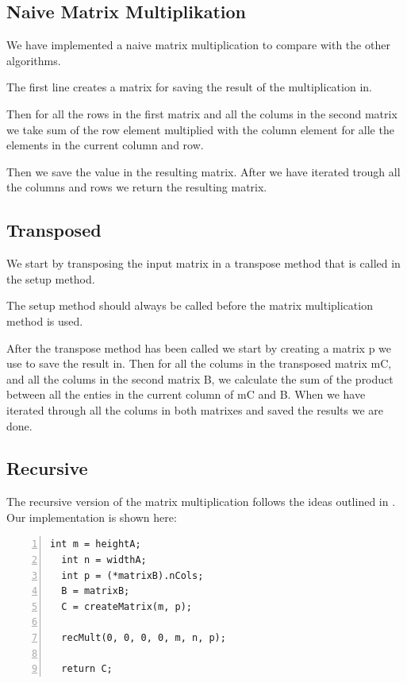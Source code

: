 \subsection{Naive Matrix Multiplikation}
We have implemented a naive matrix multiplication to compare with the other algorithms.

The first line creates a matrix for saving the result of the multiplication in.

Then for all the rows in the first matrix and all the colums in the second matrix we take sum of the row element multiplied with the column element for alle the elements in the current column and row.

Then we save the value in the resulting matrix.
After we have iterated trough all the columns and rows we return the resulting matrix.


\subsection{Transposed}

We start by transposing the input matrix in a transpose method that is called in the setup method.

The setup method should always be called before the matrix multiplication method is used.

After the transpose method has been called we start by creating a matrix p we use to save the result in.
Then for all the colums in the transposed matrix mC, and all the colums in the second matrix B, we calculate the sum of the product between all the enties in the current column of mC and B.
When we have iterated through all the colums in both matrixes and saved the results we are done.



\subsection{Recursive}
The recursive version of the matrix multiplication follows the ideas outlined in \citep{matrixMultiplication}.
Our implementation is shown here:
\begin{lstlisting}[numbers=left]
  int m = heightA;
  int n = widthA;
  int p = (*matrixB).nCols;
  B = matrixB;
  C = createMatrix(m, p);
  
  recMult(0, 0, 0, 0, m, n, p);
  
  return C;
\end{lstlisting}

